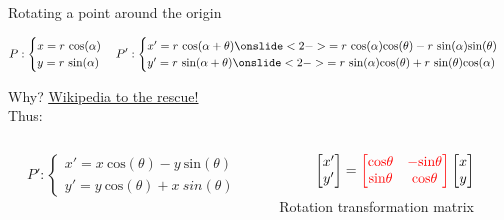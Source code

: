 \documentclass[9pt, aspectratio=169]{beamer}
\begin{document}
\begin{frame}
    {Rotating a point around the origin}
    \center
    {
    }

    $$P: \begin{cases}x = r~\text{cos}(\alpha)\\y = r~\text{sin}(\alpha)\end{cases}
        P': \begin{cases}x' = r~\text{cos}(\alpha+\theta)\onslide<2->{= r~\text{cos}(\alpha)\text{cos}(\theta)-r~\text{sin}(\alpha)\text{sin}(\theta)}\\y' = r~\text{sin}(\alpha+\theta)\onslide<2->{= r~\text{sin}(\alpha)\text{cos}(\theta)+r~\text{sin}(\theta)\text{cos}(\alpha)}\end{cases}$$

    \pause
    \footnotesize
    Why? \href{https://en.wikipedia.org/wiki/List\_of\_trigonometric\_identities\#Angle\_sum\_and\_difference\_identities}{\underline{Wikipedia to the rescue!}}\\
    \pause
    \normalsize
    Thus:
    \begin{columns}
        \begin{column}{0.5\textwidth}
            $$P': \begin{cases}x' = x~\text{cos}(\theta)-y~\text{sin}(\theta)\\y' = y~\text{cos}(\theta)+x~{sin}(\theta)\end{cases}$$
        \end{column}
        \pause
        \begin{column}{0.5\textwidth}
            $$\begin{bmatrix}x'\\y'\end{bmatrix} = \color{red}\begin{bmatrix}\text{cos}\theta&-\text{sin}\theta\\\text{sin}\theta&\text{cos}\theta\end{bmatrix}\color{black}\begin{bmatrix}x\\y\end{bmatrix}$$
            \centering
            \color{red}Rotation transformation matrix
        \end{column}
    \end{columns}
\end{frame}
\end{document}
